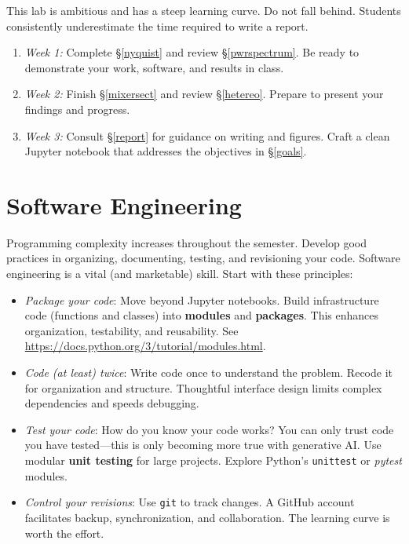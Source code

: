 \documentclass[11pt,preprint]{aastex}
\begin{document}
\noindent
This lab is ambitious and has a steep learning curve.
Do not fall behind.
Students consistently underestimate the time required to write a report.

\begin{enumerate}
    \item {\it Week 1:} Complete \S \ref{nyquist} and review \S \ref{pwrspectrum}.
    Be ready to demonstrate your work, software, and results in class.

    \item {\it Week 2:} Finish \S \ref{mixersect} and review \S \ref{hetereo}.
    Prepare to present your findings and progress.

    \item {\it Week 3:} Consult \S \ref{report} for guidance on writing and figures.
    Craft a clean Jupyter notebook that addresses the objectives in \S\ref{goals}.
\end{enumerate}


\section{Software Engineering}

\noindent
Programming complexity increases throughout the semester.
Develop good practices in organizing, documenting, testing, and revisioning your code.
Software engineering is a vital (and marketable) skill.
Start with these principles:

\begin{itemize}
    \item {\it Package your code}:
    Move beyond Jupyter notebooks.
    Build infrastructure code (functions and classes) into {\bf modules}
    and {\bf packages}.
    This enhances organization, testability, and reusability.
    See \url{https://docs.python.org/3/tutorial/modules.html}.

    \item {\it Code (at least) twice}:
    Write code once to understand the problem.
    Recode it for organization and structure.
    Thoughtful interface design limits complex dependencies and speeds debugging.

    \item {\it Test your code}:
    How do you know your code works?
    You can only trust code you have tested---this is only becoming more true with generative AI.
    Use modular {\bf unit testing} for large projects.
    Explore Python's {\tt unittest} or {\it pytest} modules.

    \item {\it Control your revisions}:
    Use {\tt git} to track changes.
    A GitHub account facilitates backup, synchronization, and collaboration.
    The learning curve is worth the effort.
\end{itemize}
\end{document}
